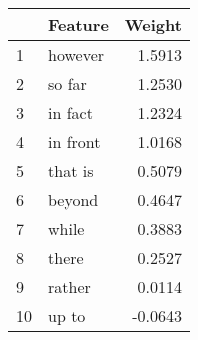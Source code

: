 \begin{tabular}{llr}
\toprule
{} &   Feature &  Weight \\
\midrule
1  &   however &  1.5913 \\
2  &    so far &  1.2530 \\
3  &   in fact &  1.2324 \\
4  &  in front &  1.0168 \\
5  &   that is &  0.5079 \\
6  &    beyond &  0.4647 \\
7  &     while &  0.3883 \\
8  &     there &  0.2527 \\
9  &    rather &  0.0114 \\
10 &     up to & -0.0643 \\
\bottomrule
\end{tabular}
